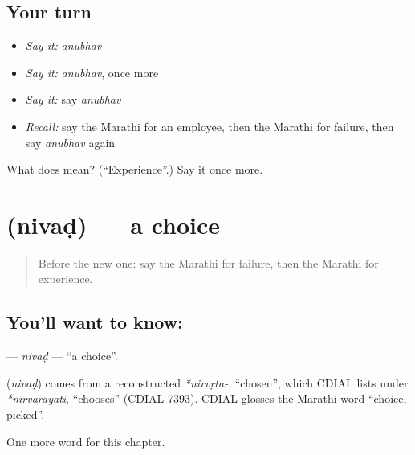 \subsection*{Your turn}
\begin{itemize}
\raggedright
  \item \emph{Say it:} \emph{anubhav}
  \item \emph{Say it:} \emph{anubhav}, once more
  \item \emph{Say it:} say \emph{anubhav}
  \item \emph{Recall:} say the Marathi for an employee, then the Marathi for failure, then say \emph{anubhav} again
\end{itemize}

\begin{tcolorbox}[breakable,colback=teal!4,colframe=teal!35!black,title={Before you move on}]
What does  mean? (\textquotedblleft{}Experience\textquotedblright{}.) Say it once more.
\end{tcolorbox}
\section[\texorpdfstring{\mr{निवड} (nivaḍ)}{निवड (nivaḍ)}]{ (nivaḍ) — a choice}

\label{lesson:MR-C211-nivad}



\begin{quote}
Before the new one: say the Marathi for failure, then the Marathi for experience.
\end{quote}

\subsection*{You'll want to know: }
\textbf{} — \emph{nivaḍ} — \textquotedblleft{}a choice\textquotedblright{}.

\begin{cousinweb}
\textbf{} (\emph{nivaḍ}) comes from a reconstructed \emph{*nirvṛta-}, \textquotedblleft{}chosen\textquotedblright{}, which CDIAL lists under \emph{*nirvarayati}, \textquotedblleft{}chooses\textquotedblright{} (CDIAL 7393). CDIAL glosses the Marathi word \textquotedblleft{}choice, picked\textquotedblright{}.
\end{cousinweb}

\begin{grammarlens}[title={What you've built}]
One more word for this chapter.
\end{grammarlens}

